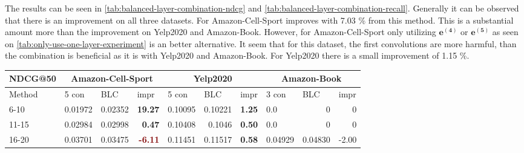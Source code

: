 The results can be seen in \autoref{tab:balanced-layer-combination-ndcg} and \autoref{tab:balanced-layer-combination-recall}.
Generally it can be observed that there is an improvement on all three datasets. %
For Amazon-Cell-Sport improves with 7.03 \% from this method.
This is a substantial amount more than the improvement on Yelp2020 and Amazon-Book.
However, for Amazon-Cell-Sport only utilizing $\mathbf{e^{(4)}}$ or $\mathbf{e^{(5)}}$ as seen on \autoref{tab:only-use-one-layer-experiment} is an better alternative.
It seem that for this dataset, the first convolutions are more harmful, than the combination is beneficial as it is with Yelp2020 and Amazon-Book.
For Yelp2020 there is a small improvement of 1.15 \%.

\begin{table*}[h!] %
    \centering     %
    \begin{tabular}{|l|r|r|r||l|r|r||l|l|l|}
        \hline
        NDCG@50 & \multicolumn{3}{c||}{Amazon-Cell-Sport} & \multicolumn{3}{c||}{Yelp2020} & \multicolumn{3}{c|}{Amazon-Book}                                                                                                                                                \\ \hline
        Method  & \multicolumn{1}{l|}{5 con}              & \multicolumn{1}{l|}{BLC}       & \multicolumn{1}{l||}{impr}             & 5 con   & \multicolumn{1}{l|}{BLC} & \multicolumn{1}{l||}{impr}            & 3 con   & BLC                    & impr                   \\ \hline
        6-10    & 0.01972                                 & 0.02352                        & \textbf{\textcolor{OliveGreen}{19.27}} & 0.10095 & 0.10221                  & \textbf{\textcolor{OliveGreen}{1.25}} & 0.0     & \multicolumn{1}{r|}{0} & \multicolumn{1}{r|}{0} \\ \hline
        11-15   & 0.02984                                 & 0.02998                        & \textbf{\textcolor{OliveGreen}{0.47}}  & 0.10408 & 0.1046                   & \textbf{\textcolor{OliveGreen}{0.50}} & 0.0     & \multicolumn{1}{r|}{0} & \multicolumn{1}{r|}{0} \\ \hline
        16-20   & 0.03701                                 & 0.03475                        & \textbf{\textcolor{Maroon}{-6.11}}     & 0.11451 & 0.11517                  & \textbf{\textcolor{OliveGreen}{0.58}} & 0.04929 & 0.04830                & -2.00                  \\ \hline

\end{tabular}
\end{table*}
